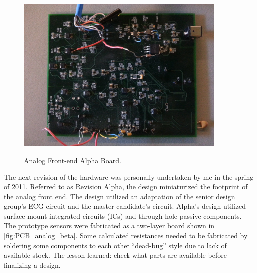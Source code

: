 \begin{figure}
	\begin{center}
		\label{fig:PCB_alpha}
		\includegraphics[scale=1,width=0.9\textwidth]{Images/PCB_Alpha.jpg} 
		\caption{Analog Front-end Alpha Board.}
	\end{center}
\end{figure}

The next revision of the hardware was personally undertaken by me in the spring of 2011. Referred to as Revision Alpha, the design miniaturized the footprint of the analog front end. The design utilized an adaptation of the senior design group's ECG circuit and the master candidate's  circuit. Alpha's design utilized surface mount integrated circuits (ICs) and through-hole passive components. The prototype sensors were fabricated as a two-layer board shown in \cref{fig:PCB_analog_beta}. Some calculated resistances needed to be fabricated by soldering some components to each other “dead-bug” style due to lack of available stock. The lesson learned: check what parts are available before finalizing a design.

